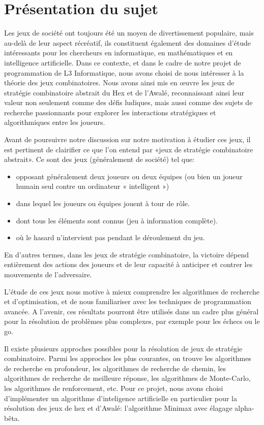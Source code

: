 \section{Présentation du sujet}
Les jeux de société ont toujours été un moyen de divertissement populaire, mais au-delà 
de leur aspect récréatif, ils constituent également des domaines d'étude intéressants pour les 
chercheurs en informatique, en mathématiques et en intelligence artificielle. 
Dans ce contexte, et dans le cadre de notre projet de programmation de L3 Informatique, 
nous avons choisi de nous intéresser à la théorie des jeux combinatoires. Nous avons ainsi mis 
en œuvre les jeux de stratégie combinatoire abstrait du Hex et de l'Awalé, reconnaissant ainsi 
leur valeur non seulement comme des défis ludiques, mais aussi comme des sujets de recherche 
passionnants pour explorer les interactions stratégiques et algorithmiques entre les joueurs.

Avant de poursuivre notre discussion sur notre motivation à étudier ces jeux, il est pertinent
de clairifier ce que l'on entend par «jeux de stratégie combinatoire abstrait». Ce sont des jeux 
(généralement de société) tel que:
\begin{itemize}
	\item opposant généralement deux joueurs ou deux équipes (ou bien un joueur humain seul 
	contre un ordinateur « intelligent »)
	\item dans lequel les joueurs ou équipes jouent à tour de rôle.
	\item dont tous les éléments sont connus (jeu à information complète).
	\item où le hasard n'intervient pas pendant le déroulement du jeu.
\end{itemize}
En d'autres termes, dans les jeux de stratégie combinatoire, la victoire dépend entièrement 
des actions des joueurs et de leur capacité à anticiper et contrer les mouvements de l'adversaire. 


L'étude de ces jeux nous motive à mieux comprendre les algorithmes de 
recherche et d'optimisation, et de nous familiariser avec les techniques de 
programmation avancée. A l'avenir, ces résultats pourront être utilisés dans
un cadre plus général pour la résolution de problèmes plus complexes, par exemple
pour les échecs ou le go. 


Il existe plusieurs approches possibles pour la résolution de jeux de stratégie
combinatoire. Parmi les approches les plus courantes, on trouve les algorithmes
de recherche en profondeur, les algorithmes de recherche de chemin, les
algorithmes de recherche de meilleure réponse, les algorithmes de Monte-Carlo,
les algorithmes de renforcement, etc.
Pour ce projet, nous avons choisi d'implémenter un algorithme d'inteligence artificielle 
en particulier pour la résolution des jeux de hex et d'Awalé: l'algorithme Minimax avec élagage
alpha-bêta.

